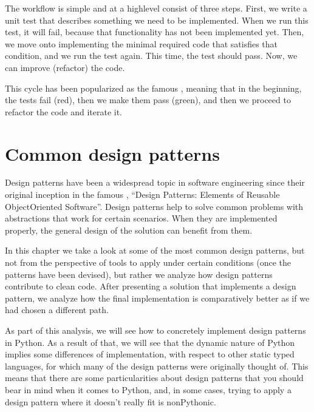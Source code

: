 \documentclass[a4paper,10pt,english]{sphinxmanual}
\begin{document}
The workflow is simple and at a high\sphinxhyphen{}level consist of three steps. First, we write a unit test
that describes something we need to be implemented. When we run this test, it will fail,
because that functionality has not been implemented yet. Then, we move onto
implementing the minimal required code that satisfies that condition, and we run the test
again. This time, the test should pass. Now, we can improve (refactor) the code.

This cycle has been popularized as the famous , meaning that in the
beginning, the tests fail (red), then we make them pass (green), and then we proceed to
refactor the code and iterate it.


\chapter{Common design patterns}
\label{\detokenize{chapters/9_design_patterns/index:common-design-patterns}}\label{\detokenize{chapters/9_design_patterns/index::doc}}
Design patterns have been a widespread topic in software engineering since their original
inception in the famous , “Design Patterns: Elements of Reusable
Object\sphinxhyphen{}Oriented Software”. Design patterns help to solve common problems with abstractions
that work for certain scenarios. When they are implemented properly, the general design of
the solution can benefit from them.

In this chapter we take a look at some of the most common design patterns, but not from
the perspective of tools to apply under certain conditions (once the patterns have been
devised), but rather we analyze how design patterns contribute to clean code. After
presenting a solution that implements a design pattern, we analyze how the final
implementation is comparatively better as if we had chosen a different path.

As part of this analysis, we will see how to concretely implement design patterns in Python.
As a result of that, we will see that the dynamic nature of Python implies some differences
of implementation, with respect to other static typed languages, for which many of the
design patterns were originally thought of. This means that there are some particularities
about design patterns that you should bear in mind when it comes to Python, and, in some
cases, trying to apply a design pattern where it doesn’t really fit is non\sphinxhyphen{}Pythonic.
\end{document}
